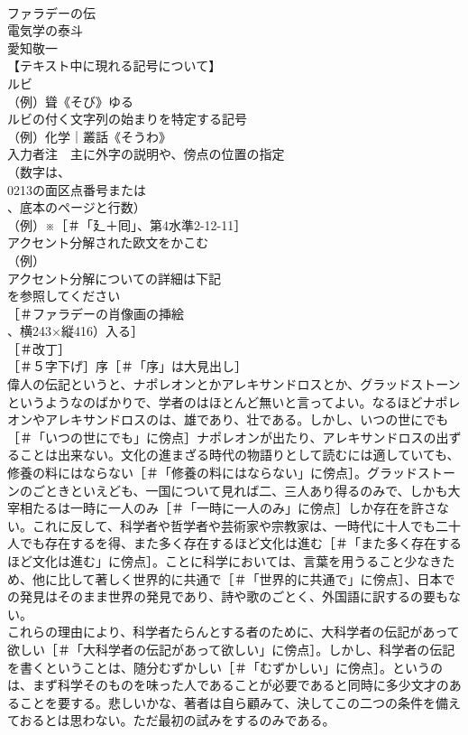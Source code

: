 \documentclass[8pt]{extreport}
\begin{document}
\begin{CJK}{UTF8}{min}
\\	ファラデーの伝
\\	電気学の泰斗
\\	愛知敬一
\\	【テキスト中に現れる記号について】
\\	ルビ
\\	（例）聳《そび》ゆる
\\	ルビの付く文字列の始まりを特定する記号
\\	（例）化学｜叢話《そうわ》
\\	入力者注　主に外字の説明や、傍点の位置の指定
\\	（数字は、
\\	0213の面区点番号または
\\	、底本のページと行数）
\\	（例）※［＃「廴＋囘」、第4水準2-12-11］
\\	アクセント分解された欧文をかこむ
\\	（例）
\\	アクセント分解についての詳細は下記
\\	を参照してください
\\	［＃ファラデーの肖像画の挿絵
\\	、横243×縦416）入る］
\\	［＃改丁］
\\	［＃５字下げ］序［＃「序」は大見出し］
\\	偉人の伝記というと、ナポレオンとかアレキサンドロスとか、グラッドストーンというようなのばかりで、学者のはほとんど無いと言ってよい。なるほどナポレオンやアレキサンドロスのは、雄であり、壮である。しかし、いつの世にでも［＃「いつの世にでも」に傍点］ナポレオンが出たり、アレキサンドロスの出ずることは出来ない。文化の進まざる時代の物語りとして読むには適していても、修養の料にはならない［＃「修養の料にはならない」に傍点］。グラッドストーンのごときといえども、一国について見れば二、三人あり得るのみで、しかも大宰相たるは一時に一人のみ［＃「一時に一人のみ」に傍点］しか存在を許さない。これに反して、科学者や哲学者や芸術家や宗教家は、一時代に十人でも二十人でも存在するを得、また多く存在するほど文化は進む［＃「また多く存在するほど文化は進む」に傍点］。ことに科学においては、言葉を用うること少なきため、他に比して著しく世界的に共通で［＃「世界的に共通で」に傍点］、日本での発見はそのまま世界の発見であり、詩や歌のごとく、外国語に訳するの要もない。
\\	これらの理由により、科学者たらんとする者のために、大科学者の伝記があって欲しい［＃「大科学者の伝記があって欲しい」に傍点］。しかし、科学者の伝記を書くということは、随分むずかしい［＃「むずかしい」に傍点］。というのは、まず科学そのものを味った人であることが必要であると同時に多少文才のあることを要する。悲しいかな、著者は自ら顧みて、決してこの二つの条件を備えておるとは思わない。ただ最初の試みをするのみである。

\end{CJK}
\end{document}

